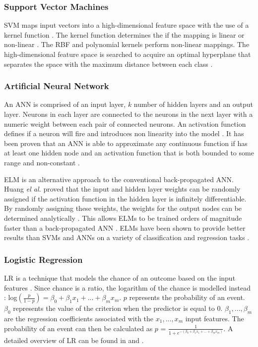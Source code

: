 \documentclass{sig-alternate-05-2015}
\begin{document}
	\subsubsection{Support Vector Machines}
	SVM maps input vectors into a high-dimensional feature space with the use of a kernel function \cite{Danenas20153194}. The kernel function determines the if the mapping is linear or non-linear \cite{Luo20097562}. The RBF and polynomial kernels perform non-linear mappings. The high-dimensional feature space is searched to acquire an optimal hyperplane that separates the space with the maximum distance between each class \cite{Danenas20153194}.
	
	\subsubsection{Artificial Neural Network}
	An ANN is comprised of an input layer, $k$ number of hidden layers and an output layer. Neurons in each layer are connected to the neurons in the next layer with a numeric weight between each pair of connected neurons. An activation function defines if a neuron will fire and introduces non linearity into the model \cite{Wang2003}. It has been proven that an ANN is able to approximate any continuous function if has at least one hidden node and an activation function that is both bounded to some range and non-constant \cite{Hornik1991251}.
	
	ELM is an alternative approach to the conventional back-propagated ANN. Huang \textit{el al.} \cite{Huang2006489} proved that the input and hidden layer weights can be randomly assigned if the activation function in the hidden layer is infinitely differentiable. By randomly assigning these weights, the weights for the output nodes can be determined analytically \cite{Huang2006489}. This allows ELMs to be trained orders of magnitude faster than a back-propagated ANN \cite{6035797, Huang2006489}. ELMs have been shown to provide better results than SVMs and ANNs on a variety of classification and regression tasks \cite{6035797, Huang2006489}.
	
	\subsubsection{Logistic Regression}
	LR is a technique that models the chance of an outcome based on the input features \cite{doi:10.11613/BM.2014.003}. Since chance is a ratio, the logarithm of the chance is modelled instead \cite{doi:10.11613/BM.2014.003}:
	log$(\frac{p}{1 - p}) = \beta_0 + \beta_1 x_1 + ... + \beta_m x_m$. $p$ represents the probability of an event. $\beta_0$ represents the value of the criterion when the predictor is equal to 0. $\beta_1, ..., \beta_m$ are the regression coefficients associated with the $x_1, ..., x_m$ input features. The probability of an event can then be calculated as $p$ = $\frac{1}{1 + e^{-(\beta_0 + \beta_1 x_1 + ... + \beta_m x_m)}}$. A detailed overview of LR can be found in \cite{Mood01022010} and \cite{doi:10.11613/BM.2014.003}.
	
\end{document}
